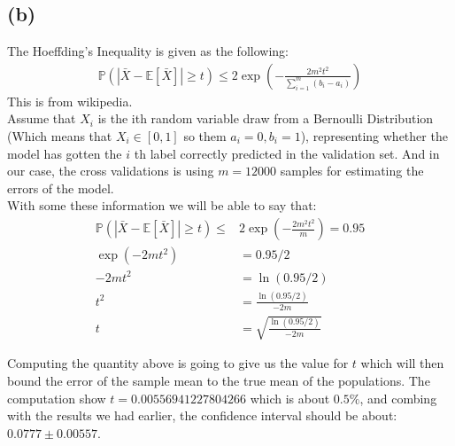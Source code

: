 \documentclass[]{article}
\begin{document}
		\subsection*{(b)}
			The Hoeffding's Inequality is given as the following: 
			\begin{align*}\tag{B.2.1}\label{eqn:B.2.1}
				\mathbb{P}\left(
					\left|
						\bar{X} - 
						\mathbb{E}\left[\bar{X}\right]
					\right|
					\ge t
				\right)
				\le 
				2
				\exp\left(
					-\frac{2m^2t^2}{
						\sum_{i = 1}^{m}(b_i - a_i)
					}
				\right)
			\end{align*}
			This is from wikipedia.
			\\
			Assume that $X_i$ is the ith random variable draw from a Bernoulli Distribution (Which means that $X_i\in[0, 1]$ so them $a_i = 0, b_i = 1$), representing whether the model has gotten the $i$ th label correctly predicted in the validation set.  And in our case, the cross validations is using $m = 12000$ samples for estimating the errors of the model. 
			\\
			With some these information we will be able to say that: 
			\begin{align*}\tag{B.2.2}\label{eqn:B.2.2}
				\mathbb{P}\left(
					\left|
						\bar{X} - 
						\mathbb{E}\left[\bar{X}\right]
					\right|
					\ge t
				\right)
				\le& 
				2\exp\left(
					-\frac{2m^2t^2}{
						m
					}
				\right) = 0.95
				\\
				\exp
				\left(
					-2mt^2
				\right)
				&= 0.95/2
				\\
				-2mt^2 &= \ln(0.95/2)
				\\
				t^2 &= \frac{\ln(0.95/2)}{-2m}
				\\
				t &= \sqrt{\frac{\ln(0.95/2)}{-2m}}
			\end{align*}
			
	Computing the quantity above is going to give us the value for $t$ which will then bound the error of the sample mean to the true mean of the populations. The computation show $t = 0.00556941227804266$ which is about $0.5\%$, and combing with the results we had earlier, the confidence interval should be about: $0.0777 \pm 0.00557$.
\end{document}
